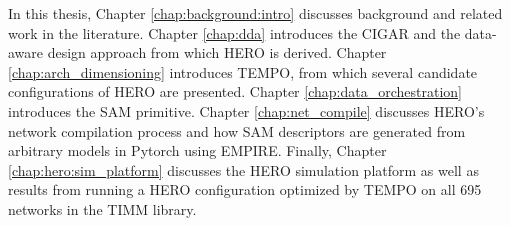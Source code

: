In this thesis, Chapter \ref{chap:background:intro} discusses background and
related work in the literature. Chapter \ref{chap:dda} introduces the CIGAR and
the data-aware design approach from which HERO is derived. Chapter
\ref{chap:arch_dimensioning} introduces TEMPO, from which several candidate
configurations of HERO are presented. Chapter \ref{chap:data_orchestration}
introduces the SAM primitive. Chapter \ref{chap:net_compile} discusses HERO's
network compilation process and how SAM descriptors are generated from arbitrary
models in Pytorch using EMPIRE. Finally, Chapter \ref{chap:hero:sim_platform}
discusses the HERO simulation platform as well as results from running a HERO
configuration optimized by TEMPO on all 695 networks in the TIMM library.